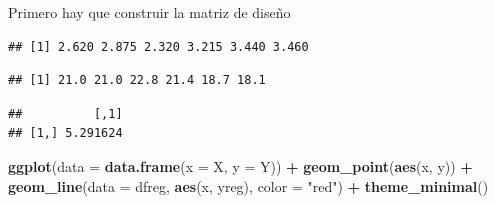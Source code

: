 \documentclass[
  12pt,
]{book}
\newenvironment{Shaded}{\begin{snugshade}}{\end{snugshade}}
\newcommand{\DataTypeTok}[1]{\textcolor[rgb]{0.13,0.29,0.53}{#1}}
\newcommand{\KeywordTok}[1]{\textcolor[rgb]{0.13,0.29,0.53}{\textbf{#1}}}
\newcommand{\NormalTok}[1]{#1}
\newcommand{\OperatorTok}[1]{\textcolor[rgb]{0.81,0.36,0.00}{\textbf{#1}}}
\newcommand{\StringTok}[1]{\textcolor[rgb]{0.31,0.60,0.02}{#1}}
\theoremstyle{definition}
\theoremstyle{definition}
\theoremstyle{definition}
\theoremstyle{remark}
\begin{document}
Primero hay que construir la matriz de diseño

\begin{Shaded}
\end{Shaded}

\begin{verbatim}
## [1] 2.620 2.875 2.320 3.215 3.440 3.460
\end{verbatim}

\begin{Shaded}
\end{Shaded}

\begin{verbatim}
## [1] 21.0 21.0 22.8 21.4 18.7 18.1
\end{verbatim}

\begin{Shaded}
\end{Shaded}

\begin{verbatim}
##          [,1]
## [1,] 5.291624
\end{verbatim}

\begin{Shaded}
\end{Shaded}

\begin{Shaded}
\begin{Highlighting}[]
\KeywordTok{ggplot}\NormalTok{(}\DataTypeTok{data =} \KeywordTok{data.frame}\NormalTok{(}\DataTypeTok{x =}\NormalTok{ X, }\DataTypeTok{y =}\NormalTok{ Y)) }\OperatorTok{+}\StringTok{ }\KeywordTok{geom_point}\NormalTok{(}\KeywordTok{aes}\NormalTok{(x, }
\NormalTok{    y)) }\OperatorTok{+}\StringTok{ }\KeywordTok{geom_line}\NormalTok{(}\DataTypeTok{data =}\NormalTok{ dfreg, }\KeywordTok{aes}\NormalTok{(x, yreg), }\DataTypeTok{color =} \StringTok{"red"}\NormalTok{) }\OperatorTok{+}\StringTok{ }
\StringTok{    }\KeywordTok{theme_minimal}\NormalTok{()}
\end{Highlighting}
\end{Shaded}
\end{document}
